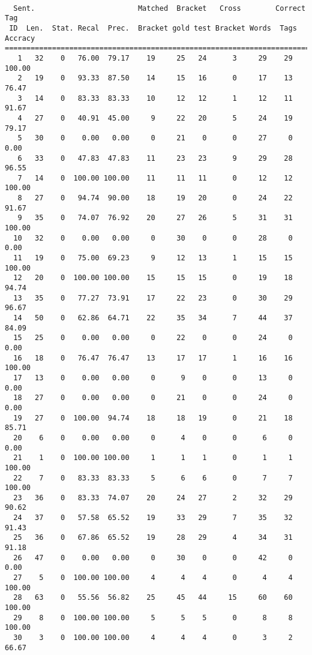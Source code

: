 \begin{verbatim}

  Sent.                        Matched  Bracket   Cross        Correct Tag
 ID  Len.  Stat. Recal  Prec.  Bracket gold test Bracket Words  Tags Accracy
============================================================================
   1   32    0   76.00  79.17    19     25   24      3     29    29   100.00
   2   19    0   93.33  87.50    14     15   16      0     17    13    76.47
   3   14    0   83.33  83.33    10     12   12      1     12    11    91.67
   4   27    0   40.91  45.00     9     22   20      5     24    19    79.17
   5   30    0    0.00   0.00     0     21    0      0     27     0     0.00
   6   33    0   47.83  47.83    11     23   23      9     29    28    96.55
   7   14    0  100.00 100.00    11     11   11      0     12    12   100.00
   8   27    0   94.74  90.00    18     19   20      0     24    22    91.67
   9   35    0   74.07  76.92    20     27   26      5     31    31   100.00
  10   32    0    0.00   0.00     0     30    0      0     28     0     0.00
  11   19    0   75.00  69.23     9     12   13      1     15    15   100.00
  12   20    0  100.00 100.00    15     15   15      0     19    18    94.74
  13   35    0   77.27  73.91    17     22   23      0     30    29    96.67
  14   50    0   62.86  64.71    22     35   34      7     44    37    84.09
  15   25    0    0.00   0.00     0     22    0      0     24     0     0.00
  16   18    0   76.47  76.47    13     17   17      1     16    16   100.00
  17   13    0    0.00   0.00     0      9    0      0     13     0     0.00
  18   27    0    0.00   0.00     0     21    0      0     24     0     0.00
  19   27    0  100.00  94.74    18     18   19      0     21    18    85.71
  20    6    0    0.00   0.00     0      4    0      0      6     0     0.00
  21    1    0  100.00 100.00     1      1    1      0      1     1   100.00
  22    7    0   83.33  83.33     5      6    6      0      7     7   100.00
  23   36    0   83.33  74.07    20     24   27      2     32    29    90.62
  24   37    0   57.58  65.52    19     33   29      7     35    32    91.43
  25   36    0   67.86  65.52    19     28   29      4     34    31    91.18
  26   47    0    0.00   0.00     0     30    0      0     42     0     0.00
  27    5    0  100.00 100.00     4      4    4      0      4     4   100.00
  28   63    0   55.56  56.82    25     45   44     15     60    60   100.00
  29    8    0  100.00 100.00     5      5    5      0      8     8   100.00
  30    3    0  100.00 100.00     4      4    4      0      3     2    66.67

\end{verbatim}
